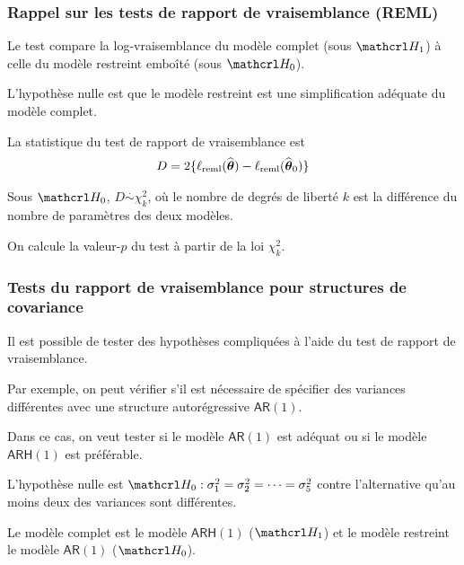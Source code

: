 \documentclass{beamer}
\begin{document}
\begin{frame}
\frametitle{Rappel sur les tests de rapport de vraisemblance (REML)}

\bi
\item Le test compare la log-vraisemblance du modèle complet (sous $\Hy_1$) à celle du modèle restreint emboîté (sous $\Hy_0$).
\item L'hypothèse nulle est que le modèle restreint est une simplification adéquate du modèle complet.
\item La statistique du test de rapport de vraisemblance est
\begin{align*}
D=2\{\ell_{\textrm{reml}}(\widehat{\boldsymbol {\theta}})- \ell_{\textrm{reml}}(\widehat{\boldsymbol {\theta}}_0)\} \end{align*}
\item Sous $\Hy_0$, $D \stackrel{\cdot}{\sim}\chi^2_k$, où le nombre de degrés de liberté $k$ est la différence du nombre de paramètres des deux modèles. 
\item On calcule la valeur-$p$ du test à partir de la loi $\chi^2_k$.
\ei
\end{frame}
\begin{frame}[fragile]
\frametitle{Tests du rapport de vraisemblance pour structures de covariance}
\bi
\item Il est possible de tester des hypothèses compliquées à l'aide du test de rapport de vraisemblance.
\item Par exemple, on peut vérifier s'il est nécessaire de spécifier des variances différentes avec une structure autorégressive $\mathsf{AR}(1)$.
\item Dans ce cas, on veut tester si le modèle $\mathsf{AR}(1)$ est adéquat ou si le modèle $\mathsf{ARH}(1)$ est préférable.
\item L'hypothèse nulle est $
\Hy_0: \sigma_1^2=\sigma_2^2=\cdots=\sigma_5^2$ contre l'alternative qu'au moins deux des variances sont différentes.
\item Le \alert{modèle complet} est le modèle $\mathsf{ARH}(1)$ ($\Hy_1$) et le \alert{modèle restreint} le modèle $\mathsf{AR}(1)$ ($\Hy_0$).
\ei
\end{frame}
\end{document}
